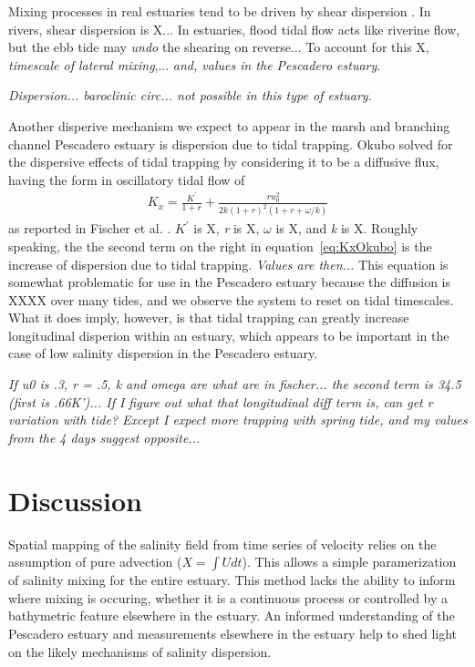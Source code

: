 Mixing processes in real estuaries tend to be driven by shear dispersion \parencite{fischer_mixing_1979}. In rivers, shear dispersion is X... In estuaries, flood tidal flow acts like riverine flow, but the ebb tide may
\emph{undo} the shearing on reverse... To account for this X, \emph{timescale of lateral mixing},... \emph{and, values in the Pescadero estuary}. 

\emph{Dispersion... baroclinic circ... not possible in this type of estuary.}

Another disperive mechanism we expect to appear in the marsh and branching channel Pescadero estuary is dispersion due to tidal trapping. Okubo \parencite*{okubo_effect_1973} solved for the dispersive effects of tidal trapping by considering it to be a diffusive flux, having the form in oscillatory tidal flow of
\begin{eqnarray}
K_x = \frac{K^{'}}{1+r} + \frac{ru_0^2}{2k(1+r)^2(1+r+\omega / k)} \label{eq:KxOkubo}
\end{eqnarray}
as reported in Fischer et al. \parencite{fischer_mixing_1979}. $K^{'}$ is X, \emph{r} is X, $\omega$ is X, and \emph{k} is X. Roughly speaking, the the second term on the right in equation~\ref{eq:KxOkubo} is the increase of dispersion due to tidal trapping. \emph{Values are then...} 
This equation is somewhat problematic for use in the Pescadero estuary because the diffusion is XXXX over many tides, and we observe the system to reset on tidal timescales. What it does imply, however, is that tidal trapping can greatly increase longitudinal disperion within an estuary, which appears to be important in the case of low salinity dispersion in the Pescadero estuary.

\emph{If u0 is .3, r = .5, k and omega are what are in fischer... the second term is 34.5 (first is .66K')... If I figure out what that longitudinal diff term is, can get r variation with tide? Except I expect more trapping with spring tide, and my values from the 4 days suggest opposite...}

\section{Discussion} \label{sec:discCh4}

Spatial mapping of the salinity field from time series of velocity relies on the assumption of pure advection ($X = \int{U}dt$). This allows a simple paramerization of salinity mixing for the entire estuary. This method lacks the ability to inform where mixing is occuring, whether it is a continuous process or controlled by a bathymetric feature elsewhere in the estuary. An informed understanding of the Pescadero estuary and measurements elsewhere in the estuary help to shed light on the likely mechanisms of salinity dispersion.

